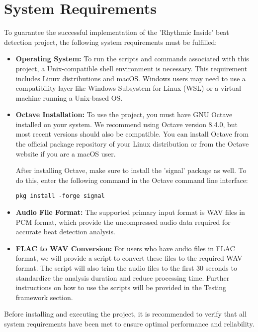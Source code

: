\section{System Requirements}

To guarantee the successful implementation of the 'Rhythmic Inside' beat detection project, the following system requirements must be fulfilled:

\begin{itemize}
    \item \textbf{Operating System:} To run the scripts and commands associated with this project, a Unix-compatible shell environment is necessary. This requirement includes Linux distributions and macOS. Windows users may need to use a compatibility layer like Windows Subsystem for Linux (WSL) or a virtual machine running a Unix-based OS.
    
    \item \textbf{Octave Installation:} To use the project, you must have GNU Octave installed on your system. We recommend using Octave version 8.4.0, but most recent versions should also be compatible. You can install Octave from the official package repository of your Linux distribution or from the Octave website if you are a macOS user.
    
After installing Octave, make sure to install the 'signal' package as well. To do this, enter the following command in the Octave command line interface:

\lstset{style=MATLABStyle}
\begin{lstlisting}[caption={Installing signal in MATLAB/Octave}, label=lst]
pkg install -forge signal
\end{lstlisting}
    
    \item \textbf{Audio File Format:} The supported primary input format is WAV files in PCM format, which provide the uncompressed audio data required for accurate beat detection analysis.
    
    \item \textbf{FLAC to WAV Conversion:} For users who have audio files in FLAC format, we will provide a script to convert these files to the required WAV format. The script will also trim the audio files to the first 30 seconds to standardize the analysis duration and reduce processing time. Further instructions on how to use the scripts will be provided in the Testing framework section.
\end{itemize}

Before installing and executing the project, it is recommended to verify that all system requirements have been met to ensure optimal performance and reliability.
